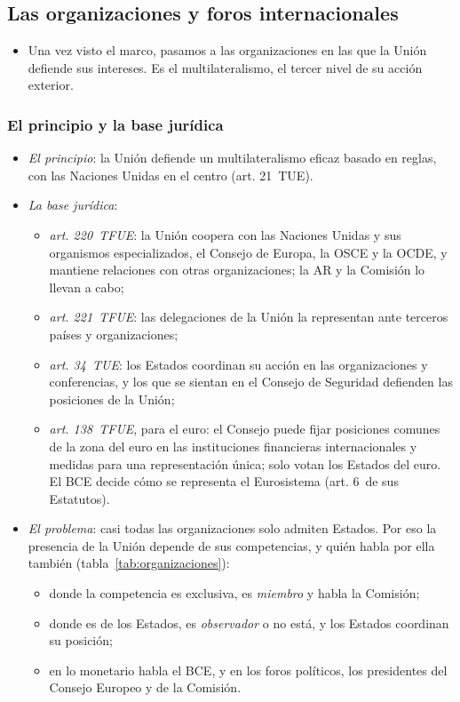 \documentclass[11pt]{article}
\begin{document}
\subsection{Las organizaciones y foros internacionales}\label{sec:organizaciones}

\begin{itemize}
\item Una vez visto el marco, pasamos a las organizaciones en las que la Unión defiende sus intereses. Es el multilateralismo, el tercer nivel de su acción exterior.
\end{itemize}

\subsubsection{El principio y la base jurídica}\label{sec:org-principio}

\begin{itemize}
\item \emph{El principio}: la Unión defiende un multilateralismo eficaz basado en reglas, con las Naciones Unidas en el centro (art. 21~TUE).
\item \emph{La base jurídica}:
  \begin{itemize}
  \item \emph{art. 220~TFUE}: la Unión coopera con las Naciones Unidas y sus organismos especializados, el Consejo de Europa, la OSCE y la OCDE, y mantiene relaciones con otras organizaciones; la AR y la Comisión lo llevan a cabo;
  \item \emph{art. 221~TFUE}: las delegaciones de la Unión la representan ante terceros países y organizaciones;
  \item \emph{art. 34~TUE}: los Estados coordinan su acción en las organizaciones y conferencias, y los que se sientan en el Consejo de Seguridad defienden las posiciones de la Unión;
  \item \emph{art. 138~TFUE}, para el euro: el Consejo puede fijar posiciones comunes de la zona del euro en las instituciones financieras internacionales y medidas para una representación única; solo votan los Estados del euro. El BCE decide cómo se representa el Eurosistema (art. 6~de sus Estatutos).
  \end{itemize}
\item \emph{El problema}: casi todas las organizaciones solo admiten Estados. Por eso la presencia de la Unión depende de sus competencias, y quién habla por ella también (tabla~\ref{tab:organizaciones}):
  \begin{itemize}
  \item donde la competencia es exclusiva, es \emph{miembro} y habla la Comisión;
  \item donde es de los Estados, es \emph{observador} o no está, y los Estados coordinan su posición;
  \item en lo monetario habla el BCE, y en los foros políticos, los presidentes del Consejo Europeo y de la Comisión.
  \end{itemize}
\end{itemize}
\end{document}
